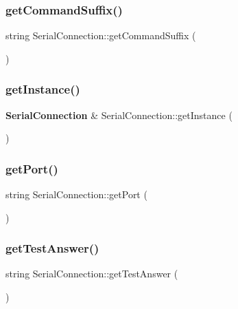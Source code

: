 \subsubsection{get\+Command\+Suffix()}
{\footnotesize\ttfamily string Serial\+Connection\+::get\+Command\+Suffix (\begin{DoxyParamCaption}{ }\end{DoxyParamCaption})}

\mbox{\label{class_serial_connection_ac98b98a509727eb43dd4e09a9bc47eb8}} 
\subsubsection{get\+Instance()}
{\footnotesize\ttfamily \textbf{ Serial\+Connection} \& Serial\+Connection\+::get\+Instance (\begin{DoxyParamCaption}{ }\end{DoxyParamCaption})\hspace{0.3cm}{\ttfamily [static]}}

\mbox{\label{class_serial_connection_a2ecb1ba029fefbc9697262e9f9cb5e5b}} 
\subsubsection{get\+Port()}
{\footnotesize\ttfamily string Serial\+Connection\+::get\+Port (\begin{DoxyParamCaption}{ }\end{DoxyParamCaption})}

\mbox{\label{class_serial_connection_a9fb2b43e439ec8b3d00aa4be0c51bcc6}} 
\subsubsection{get\+Test\+Answer()}
{\footnotesize\ttfamily string Serial\+Connection\+::get\+Test\+Answer (\begin{DoxyParamCaption}{ }\end{DoxyParamCaption})}

\mbox{\label{class_serial_connection_a254f0b760e29c3584a0e8b55601b4bc6}} 
